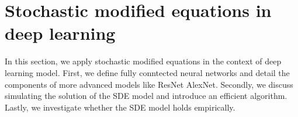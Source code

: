 \documentclass[12pt]{article}
\theoremstyle{definition}
\numberwithin{equation}{section}
\begin{document}

\section{Stochastic modified equations in deep learning}
\label{sec:smdedl}
In this section, we apply stochastic modified equations in the context of deep learning model. First, we define fully conntected neural networks and detail the components of more advanced models like ResNet AlexNet. Secondly, we discuss simulating the solution of the SDE model and introduce an efficient algorithm. Lastly, we investigate whether the SDE model holds empirically.
\end{document}
